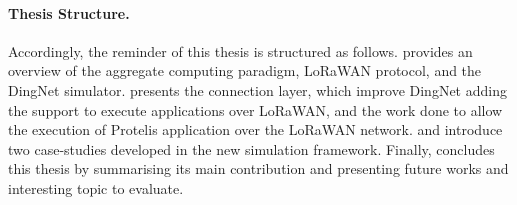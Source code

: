 %
\paragraph{Thesis Structure.} %
Accordingly, the reminder of this thesis is structured as follows.
%
 provides an overview of the aggregate computing paradigm, \mbox{LoRaWAN} protocol, and the DingNet simulator.
 presents the connection layer, which improve DingNet adding the support to execute applications over LoRaWAN, and the work done to allow the execution of Protelis application over the LoRaWAN network.
%  
 and  introduce two case-studies developed in the new simulation framework. 
% 
Finally,  concludes this thesis by summarising its main contribution and presenting future works and interesting topic to evaluate.